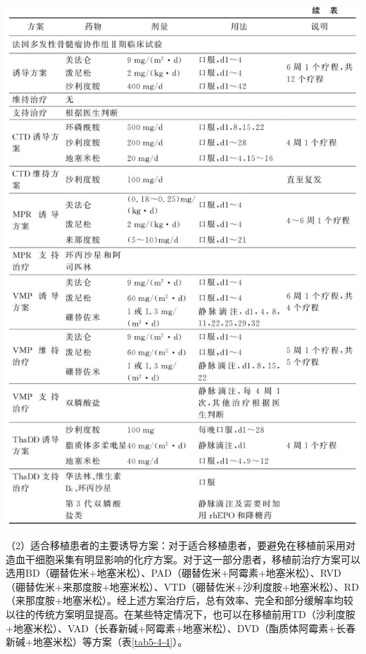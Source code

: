 \includegraphics{./images/Image00161.jpg}

（2）适合移植患者的主要诱导方案：对于适合移植患者，要避免在移植前采用对造血干细胞采集有明显影响的化疗方案。对于这一部分患者，移植前治疗方案可以选用BD（硼替佐米+地塞米松）、PAD（硼替佐米+阿霉素+地塞米松）、RVD（硼替佐米+来那度胺+地塞米松）、VTD（硼替佐米+沙利度胺+地塞米松）、RD（来那度胺+地塞米松）。经上述方案治疗后，总有效率、完全和部分缓解率均较以往的传统方案明显提高。在某些特定情况下，也可以在移植前用TD（沙利度胺+地塞米松）、VAD（长春新碱+阿霉素+地塞米松）、DVD（酯质体阿霉素+长春新碱+地塞米松）等方案（表\ref{tab5-4-4}）。

